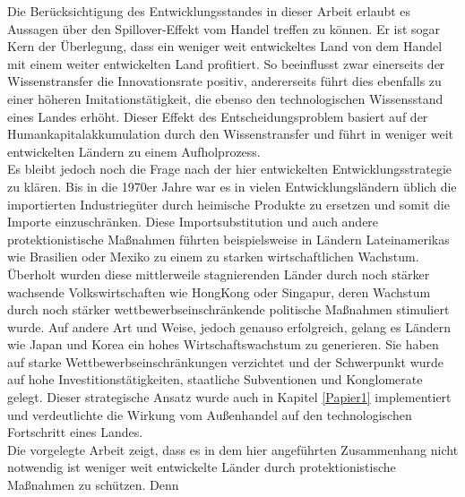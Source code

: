 %
Die Berücksichtigung des Entwicklungsstandes in dieser Arbeit erlaubt es Aussagen über den Spillover-Effekt vom Handel treffen zu können. Er ist sogar Kern der Überlegung, dass ein weniger weit entwickeltes Land von dem Handel mit einem weiter entwickelten Land profitiert. So beeinflusst zwar einerseits der Wissenstransfer die Innovationsrate positiv, andererseits führt dies ebenfalls zu einer höheren Imitationstätigkeit, die ebenso den technologischen Wissensstand eines Landes erhöht. Dieser Effekt des Entscheidungsproblem basiert auf der Humankapitalakkumulation durch den Wissenstransfer und führt in weniger weit entwickelten Ländern zu einem Aufholprozess.\\
%
Es bleibt jedoch noch die Frage nach der hier entwickelten Entwicklungsstrategie zu klären. Bis in die 1970er Jahre war es in vielen Entwicklungsländern üblich die importierten Industriegüter durch heimische Produkte zu ersetzen und somit die Importe einzuschränken. Diese Importsubstitution und auch andere protektionistische Maßnahmen führten beispielsweise in Ländern Lateinamerikas wie Brasilien oder Mexiko zu einem zu starken wirtschaftlichen  Wachstum. Überholt wurden diese mittlerweile stagnierenden Länder durch noch stärker wachsende Volkswirtschaften wie HongKong oder Singapur, deren Wachstum durch noch stärker wettbewerbseinschränkende politische Maßnahmen stimuliert wurde. Auf andere Art und Weise, jedoch genauso erfolgreich, gelang es Ländern wie Japan und Korea ein hohes Wirtschaftswachstum zu generieren. Sie haben auf starke Wettbewerbseinschränkungen verzichtet und der Schwerpunkt wurde auf hohe Investitionstätigkeiten, staatliche Subventionen und Konglomerate gelegt. Dieser strategische Ansatz wurde auch in Kapitel \ref{Papier1} implementiert und verdeutlichte die Wirkung vom Außenhandel auf den technologischen Fortschritt eines Landes.\\
%
Die vorgelegte Arbeit zeigt, dass es in dem hier angeführten Zusammenhang nicht notwendig ist weniger weit entwickelte Länder durch protektionistische Maßnahmen zu schützen. Denn 
